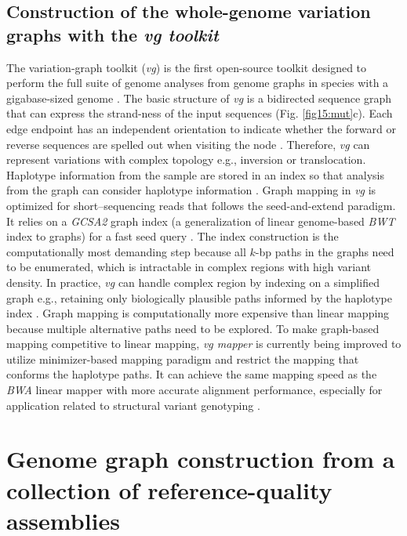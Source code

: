 \documentclass[../main.tex]{subfiles}
\begin{document}
\subsection{Construction of the whole-genome variation graphs with the \emph{vg toolkit}}

The variation-graph toolkit (\emph{vg}) is the first open-source toolkit designed to perform the full suite of genome analyses from genome graphs in species with a gigabase-sized genome \citep{garrison2018variation}. The basic structure of \emph{vg} is a bidirected sequence graph that can express the strand-ness of the input sequences (Fig. \ref{fig15:mut}c). Each edge endpoint has an independent orientation to indicate whether the forward or reverse sequences are spelled out when visiting the node \citep{paten2017genome}. Therefore, \emph{vg} can represent variations with complex topology e.g., inversion or translocation. Haplotype information from the sample are stored in an index so that analysis from the graph can consider haplotype information \citep{siren2020haplotype}. Graph mapping in \emph{ vg} is optimized for short–sequencing reads that follows the seed-and-extend paradigm. It relies on a \emph{GCSA2 }graph index (a generalization of linear genome-based\emph{ BWT} index to graphs) for a fast seed query \citep{siren2017indexing}. The index construction is the computationally most demanding step because all $k$-bp paths in the graphs need to be enumerated, which is intractable in complex regions with high variant density. In practice, \emph{vg} can handle complex region by indexing on a simplified graph e.g., retaining only biologically plausible paths informed by the haplotype index \citep{siren2017indexing}. Graph mapping is computationally more expensive than linear mapping because multiple alternative paths need to be explored. To make graph-based mapping competitive to linear mapping, \emph{vg mapper} is currently being improved to utilize minimizer-based mapping paradigm and restrict the mapping that conforms the haplotype paths. It can achieve the same mapping speed as the \emph{BWA} linear mapper with more accurate alignment performance, especially for application related to structural variant genotyping \citep{siren2020genotyping}. 

\section[Construction of the multi-assembly graphs]{Genome graph construction from a collection of reference-quality assemblies}
\end{document}
